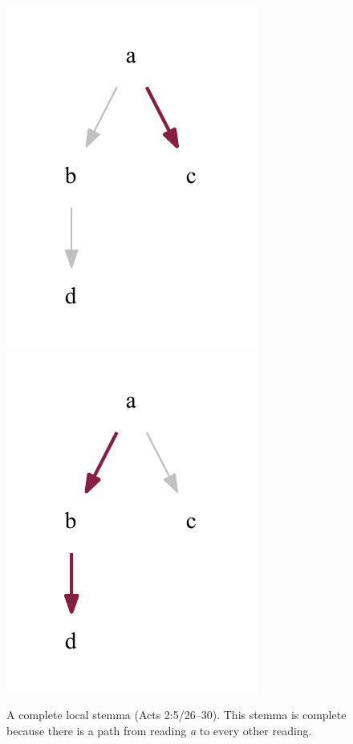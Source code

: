 \documentclass[a4paper, 12pt]{article}
\begin{document}
\begin{figure}[h!]
		\includegraphics[scale=0.6666]{../graphics/B05K2V5U26-30-local-stemma-path-2.pdf}
		\includegraphics[scale=0.6666]{../graphics/B05K2V5U26-30-local-stemma-path-3.pdf}
		\caption{A complete local stemma (Acts 2:5/26–30). This stemma is complete because there is a path from reading \emph{a} to every other reading.}
		\label{fig:local-stemma-complete}
	\end{figure}
	
	\newpage
	
\end{document}
